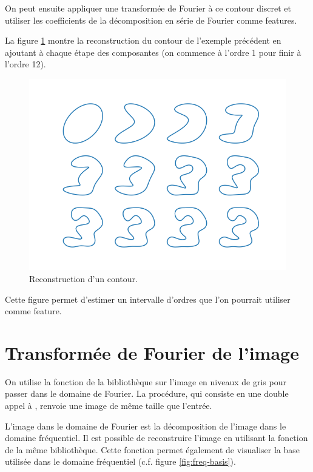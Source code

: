 On peut ensuite appliquer une transformée de Fourier à ce contour discret 
et utiliser les coefficients de la décomposition en série de Fourier comme features. 

La figure \ref{fig:contour-reconstruction} montre la reconstruction 
du contour de l'exemple précédent en ajoutant à chaque étape des 
composantes (on commence à l'ordre 1 pour finir à l'ordre 12). 

\begin{figure}[h!]
  \centering
  \includegraphics[scale=0.8]{assets/fourier-contour-image12-reconstruction}
  \caption{Reconstruction d'un contour.}
  \label{fig:contour-reconstruction}
\end{figure}

Cette figure permet d'estimer un intervalle d'ordres que l'on pourrait 
utiliser comme feature.



\section{Transformée de Fourier de l'image}

On utilise la fonction  de la bibliothèque  sur 
l'image en niveaux de gris pour passer dans le domaine de Fourier.
La procédure, qui consiste en une double appel à , renvoie une image 
de même taille que l'entrée.

L'image dans le domaine de Fourier est la décomposition de l'image dans le domaine 
fréquentiel.
Il est possible de reconstruire l'image en utilisant la 
fonction  de la même bibliothèque.
Cette fonction permet également de visualiser la base utilisée dans le domaine 
fréquentiel (c.f.\/ figure \ref{fig:freq-basis}).

